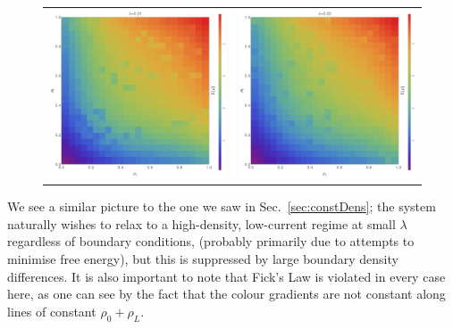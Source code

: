 \begin{figure}
\begin{center}
\begin{tabular}{c c}
\includegraphics[width=0.49\linewidth]{numerics/images/concFrames/concDataDens0p21.png} &
\includegraphics[width=0.49\linewidth]{numerics/images/concFrames/concDataDens0p25.png} \\
\end{tabular}
\end{center}
\end{figure}

We see a similar picture to the one we saw in Sec.~\ref{sec:constDens}; the system naturally 
wishes to relax to a high-density, low-current regime at small $\lambda$ regardless of boundary 
conditions, (probably primarily due to attempts to minimise free energy), but this is suppressed by
large boundary density differences. It is also important to note that Fick's Law is violated in every case here,
as one can see by the fact that the colour gradients are not constant along lines of constant $\rho_0 + \rho_L$.

